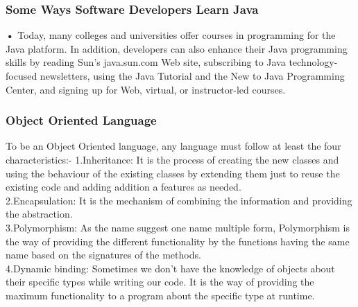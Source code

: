 \documentclass[BTech]{srmuthesis}
\begin{document}
\subsubsection{Some Ways Software Developers Learn Java}
\textbf{•} Today, many colleges and universities offer courses in programming for the Java platform. In addition, developers can also enhance their Java programming skills by reading Sun's java.sun.com Web site, subscribing to Java technology-focused newsletters, using the Java Tutorial and the New to Java Programming Center, and signing up for Web, virtual, or instructor-led courses. \\
\subsubsection{Object Oriented Language}
To be an Object Oriented language, any language must follow at least the four characteristics:-
1.Inheritance: It is the process of creating the new classes and using the behaviour of the existing classes by extending them just to reuse the existing code and adding addition a features as needed.\\
2.Encapsulation: It is the mechanism of combining the information and providing the abstraction.\\
3.Polymorphism: As the name suggest one name multiple form, Polymorphism is the way of providing the different functionality by the functions having the same name based on the signatures of the methods.\\
4.Dynamic binding: Sometimes we don't have the knowledge of objects about their specific types while writing our code. It is the way of providing the maximum functionality to a program about the specific type at runtime.\\
\end{document}
